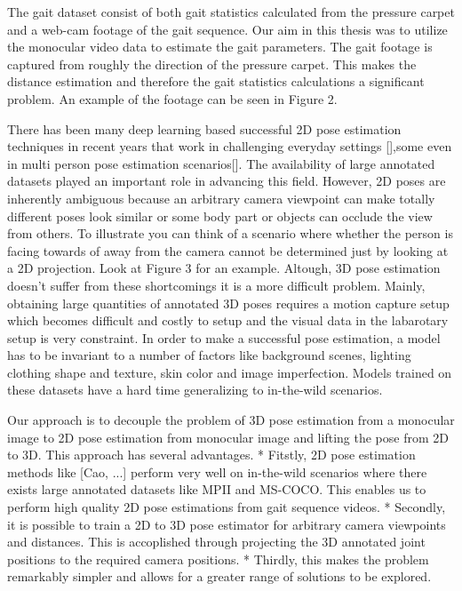 The gait dataset consist of both gait statistics calculated from the pressure carpet and a web-cam footage of the gait sequence. Our aim in this thesis was to utilize the monocular video data to estimate the gait parameters. The gait footage is captured from roughly the direction of the pressure carpet. This makes the distance estimation and therefore the gait statistics calculations a significant problem. An example of the footage can be seen in Figure 2.

There has been many deep learning based successful 2D pose estimation techniques in recent years that work in challenging everyday settings [],some even in multi person pose estimation scenarios[]. The availability of large annotated datasets played an important role in advancing this field. However, 2D poses are inherently ambiguous because an arbitrary camera viewpoint can make totally different poses look similar or some body part or objects can occlude the view from others. To illustrate you can think of a scenario where whether the person is facing towards of away from the camera cannot be determined just by looking at a 2D projection. Look at Figure 3 for an example. Altough, 3D pose estimation doesn't suffer from these shortcomings it is a more difficult problem. Mainly, obtaining large quantities of annotated 3D poses requires a motion capture setup which becomes difficult and costly to setup and the visual data in the labarotary setup is very constraint. In order to make a successful pose estimation, a model has to be invariant to a number of factors like background scenes, lighting clothing shape and texture, skin color and image imperfection. Models trained on these datasets have a hard time generalizing to in-the-wild scenarios.

Our approach is to decouple the problem of 3D pose estimation from a monocular image to 2D pose estimation from monocular image and lifting the pose from 2D to 3D. This approach has several advantages. 
* Fitstly, 2D pose estimation methods like [Cao, ...] perform very well on in-the-wild scenarios where there exists large annotated datasets like MPII and MS-COCO. This enables us to perform high quality 2D pose estimations from gait sequence videos.
* Secondly, it is possible to train a 2D to 3D pose estimator for arbitrary camera viewpoints and distances. This is accoplished through projecting the 3D annotated joint positions to the required camera positions.
* Thirdly, this makes the problem remarkably simpler and allows for a greater range of solutions to be explored.

